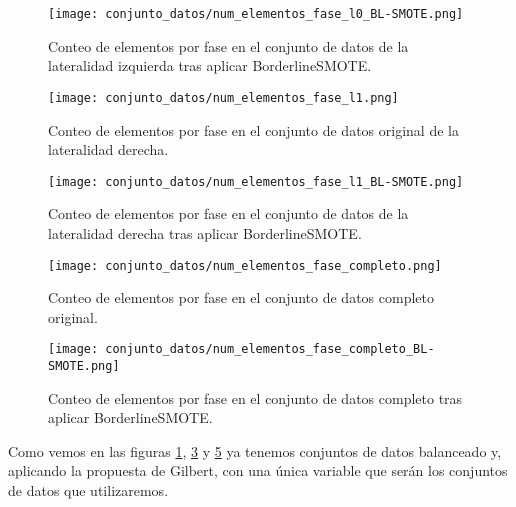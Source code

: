 \begin{figure}[H]
    \centering
     \texttt{[image: conjunto\_datos/num\_elementos\_fase\_l0\_BL-SMOTE.png]}
    \caption{Conteo de elementos por fase en el conjunto de datos de la lateralidad izquierda tras aplicar BorderlineSMOTE.}
	 \label{fig:l0-over}
\end{figure}

\begin{figure}[H]
    \centering
	  \texttt{[image: conjunto\_datos/num\_elementos\_fase\_l1.png]}
    \caption{Conteo de elementos por fase en el conjunto de datos original de la lateralidad derecha.}
	 \label{fig:l1-orig}
\end{figure}

\begin{figure}[H]
    \centering
     \texttt{[image: conjunto\_datos/num\_elementos\_fase\_l1\_BL-SMOTE.png]}
    \caption{Conteo de elementos por fase en el conjunto de datos de la lateralidad derecha tras aplicar BorderlineSMOTE.}
	 \label{fig:l1-over}
\end{figure}



\begin{figure}[H]
    \centering
	  \texttt{[image: conjunto\_datos/num\_elementos\_fase\_completo.png]}
     \label{fig:completo-orig}
    \caption{Conteo de elementos por fase en el conjunto de datos completo original.}

\end{figure}

\begin{figure}[H]
    \centering
     \texttt{[image: conjunto\_datos/num\_elementos\_fase\_completo\_BL-SMOTE.png]}
    \caption{Conteo de elementos por fase en el conjunto de datos completo tras aplicar BorderlineSMOTE.}
	 \label{fig:completo-over}
\end{figure}


Como vemos en las figuras \ref{fig:l0-over}, \ref{fig:l1-over} y \ref{fig:completo-over} ya tenemos conjuntos de datos balanceado y, aplicando la propuesta de Gilbert, con una única variable que serán los conjuntos de datos que utilizaremos.

